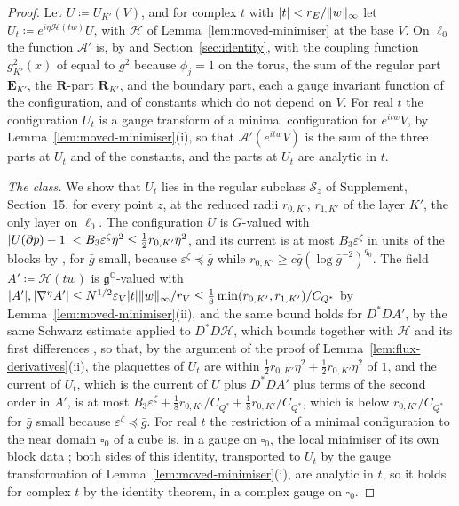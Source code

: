 \documentclass[11pt]{preprint}
\DeclarePairedDelimiter{\abs}{\lvert}{\rvert}
\DeclarePairedDelimiter{\norm}{\lVert}{\rVert}
\numberwithin{equation}{section}
\theoremstyle{definition}
\theoremstyle{remark}
\theoremstyle{plain}
\begin{document}
\begin{proof}
Let $U \coloneqq U_{K'}(V)$, and for complex $t$ with $\abs t < r_E/\norm w_\infty$ let $U_t \coloneqq e^{i\eta\mathcal H(tw)}U$, with $\mathcal H$ of Lemma~\ref{lem:moved-minimiser} at the base $V$. On $\ell_0$ the function $\mathcal A'$ is, by \cite[(2.23), p.~258]{BalabanCRE} and Section~\ref{sec:identity}, with the coupling function $g_{K'}^2(x)$ of \cite[(2.24)]{BalabanCRE} equal to $g^2$ because $\phi_j = 1$ on the torus, the sum of the regular part $\mathbf E_{K'}$, the $\mathbf R$-part $\mathbf R_{K'}$, and the boundary part, each a gauge invariant function of the configuration, and of constants which do not depend on $V$. For real $t$ the configuration $U_t$ is a gauge transform of a minimal configuration for $e^{itw}V$, by Lemma~\ref{lem:moved-minimiser}(i), so that $\mathcal A'(e^{itw}V)$ is the sum of the three parts at $U_t$ and of the constants, and the parts at $U_t$ are analytic in $t$.

\emph{The class.} We show that $U_t$ lies in the regular subclass $\mathcal S_z$ of Supplement, Section~15, for every point $z$, at the reduced radii $r_{0,K'}$, $r_{1,K'}$ of the layer $K'$, the only layer on $\ell_0$. The configuration $U$ is $G$-valued with $\abs{U(\partial p) - 1} < B_3\varepsilon^\zeta\eta^2 \leq \frac12r_{0,K'}\eta^2$, and its current is at most $B_3\varepsilon^\zeta$ in units of the blocks by \cite[(2), (170), pp.~278, 305]{BalabanVAR}, for $\bar g$ small, because $\varepsilon^\zeta \preceq \bar g$ while $r_{0,K'} \geq c\bar g(\log\bar g^{-2})^{q_0}$. The field $A' \coloneqq \mathcal H(tw)$ is $\mathfrak g^{\mathbb C}$-valued with $\abs{A'}, \abs{\nabla^\eta A'} \leq N^{1/2}\varepsilon_V\abs t\norm w_\infty/r_V \leq \frac18\min(r_{0,K'}, r_{1,K'})/C_{Q^*}$ by Lemma~\ref{lem:moved-minimiser}(ii), and the same bound holds for $D^*DA'$, by the same Schwarz estimate applied to $D^*D\mathcal H$, which \cite[(19)]{BalabanVAR} bounds together with $\mathcal H$ and its first differences \cite[Proposition~9, p.~309]{BalabanVAR}, so that, by the argument of the proof of Lemma~\ref{lem:flux-derivatives}(ii), the plaquettes of $U_t$ are within $\frac12r_{0,K'}\eta^2 + \frac12r_{0,K'}\eta^2$ of $1$, and the current of $U_t$, which is the current of $U$ plus $D^*DA'$ plus terms of the second order in $A'$, is at most $B_3\varepsilon^\zeta + \frac18r_{0,K'}/C_{Q^*} + \frac18r_{0,K'}/C_{Q^*}$, which is below $r_{0,K'}/C_{Q^*}$ for $\bar g$ small because $\varepsilon^\zeta \preceq \bar g$. For real $t$ the restriction of a minimal configuration to the near domain $\square_0$ of a cube is, in a gauge on $\square_0$, the local minimiser of its own block data \cite[(3.18), p.~273]{BalabanRG1}; both sides of this identity, transported to $U_t$ by the gauge transformation of Lemma~\ref{lem:moved-minimiser}(i), are analytic in $t$, so it holds for complex $t$ by the identity theorem, in a complex gauge on $\square_0$.


\end{proof}
\end{document}
